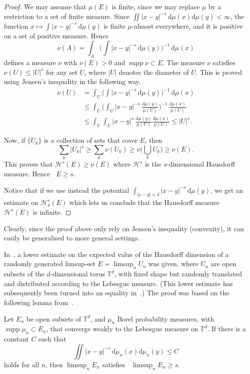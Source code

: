 \documentclass[AHL,Unicode,longabstracts]{cedram}
\DeclareMathOperator{\dimh}{dim_H}
\DeclareMathOperator{\supp}{supp}
\newcommand*{\dimh}{\mathrm{dim}_{\mathrm{H}}}
\newcommand*{\dd}{\mathrm{d}}
\begin{document}
\begin{proof}
We may assume that $\mu (E)$ is finite, since we may replace $\mu$ by a restriction to a set of finite measure. Since $\iint |x-y|^{-s}
\, \dd\mu (x) \dd \mu (y) < \infty$, the function $x
\mapsto \int |x-y|^{-s} \, \dd \mu (y)$ is finite $\mu$-almost everywhere, and it is positive on a set of positive measure. Hence
\[
\nu (A) = \int_A \biggl(\int |x-y|^{-s} \, \dd \mu (y)
\biggr)^{-1} \, \dd \mu (x)
\]
defines a measure $\nu$ with $\nu (E) > 0$ and $\supp \nu \subset E$. The measure $\nu$ satisfies $\nu(U) \leq |U|^s$ for any set $U$, where $|U|$ denotes the diameter of $U$. This is proved using Jensen's inequality in the following way.
\begin{align*}
\nu (U) &= \int_U \biggl(\int |x-y|^{-s} \, \dd \mu (y)
\biggr)^{-1} \, \dd \mu (x) \\ &\leq \int_U \biggl(\int_U |x-y|^{-s} \, \frac{\dd \mu (y)}{\mu (U)} \biggr)^{-1} \,
\frac{\dd \mu (x)}{\mu (U)} \\ &\leq \int_U \int_U |x-y|^{s} \, \frac{\dd \mu (y)}{\mu (U)} \frac{\dd
\mu (x)}{\mu (U)} \leq |U|^s.
\end{align*}

Now, if $\{U_k\}$ is a collection of sets that cover $E$, then
\[
\sum_k |U_k|^s \geq \sum_k \nu (U_k) \geq \nu \biggl(\bigcup_k U_k
\biggr) \geq \nu (E).
\]
This proves that $\mathscr{H}^s (E) \geq \nu (E)$ where $\mathscr{H}^s$ is the $s$-dimensional Hausdorff measure. Hence $\dimh E \geq s$.

Notice that if we use instead the potential $\int_{|x-y|<\delta} |x-y|^{-s} \, \dd \mu (y)$, we get an estimate on $\mathscr{H}_\delta^s (E)$ which lets us conclude that the Hausdorff measure $\mathscr{H}^s (E)$ is infinite.
\end{proof}

Clearly, since the proof above only rely on Jensen's inequality (convexity), it can easily be generalised to more general settings.

In~\cite{persson}, a lower estimate on the expected value of the Hausdorff dimension of a randomly generated limsup-set $E = \limsup_n U_n$ was given, where $U_n$ are open subsets of the $d$-dimensional torus $\mathbb{T}^d$, with fixed shape but randomly translated and distributed according to the Lebesgue measure. (This lower estimate has subsequently been turned into an equality in~\cite{fengetal}.) The proof was based on the following lemma from~\cite{perssonreeve}.

\begin{lemm} \label{lem:perssonreeve}
Let $E_n$ be open subsets of\/ $\mathbb{T}^d$, and $\mu_n$ Borel probability measures, with $\supp \mu_n \subset E_n$, that converge weakly to the Lebesgue measure on $\mathbb{T}^d$. If there is a constant $C$ such that
\begin{equation}\label{eq:bounded_energy}
\iint |x - y|^{-s} \, \dd \mu_n (x) \dd \mu_n (y)
\leq C
\end{equation}
holds for all $n$, then $\limsup_n E_n$ satisfies $\dimh \limsup_n E_n \geq s$.
\end{lemm}
\end{document}
